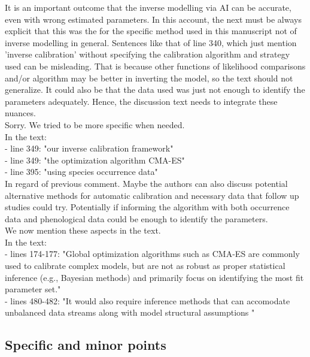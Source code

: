 \documentclass[a4paper, 11pt]{article}
\begin{document}
\noindent It is an important outcome that the inverse modelling via AI can be accurate, even with wrong estimated parameters. In this account, the next must be always explicit that this was the for the specific method used in this manuscript not of inverse modelling in general. Sentences like that of line 340, which just mention 'inverse calibration' without specifying the calibration algorithm and strategy used can be misleading. That is because other functions of likelihood comparisons and/or algorithm may be better in inverting the model, so the text should not generalize. It could also be that the data used was just not enough to identify the parameters adequately. Hence, the discussion text needs to integrate these nuances.\\
\textcolor{customblue}{Sorry. We tried to be more specific when needed.}\\
In the text:\\
- line 349: \textcolor{customred}{"our inverse calibration framework"}\\ 
- line 349: \textcolor{customred}{"the optimization algorithm CMA-ES"}\\ 
- line 395: \textcolor{customred}{"using species occurrence data"}\\ 

\noindent In regard of previous comment. Maybe the authors can also discuss potential alternative methods for automatic calibration and necessary data that follow up studies could try. Potentially if informing the algorithm with both occurrence data and phenological data could be enough to identify the parameters.\\
\textcolor{customblue}{We now mention these aspects in the text.}\\
In the text:\\
- lines 174-177: \textcolor{customred}{"Global optimization algorithms such as CMA-ES are commonly used to calibrate complex models, but are not as robust as proper statistical inference (e.g., Bayesian methods) and primarily focus on identifying the most fit parameter set."}\\
- lines 480-482: \textcolor{customred}{"It would also require inference methods that can accomodate unbalanced data streams along with model structural assumptions \citep{Oberpriller2021}"}\\

\subsection{Specific and minor points}
\end{document}
